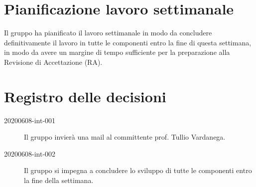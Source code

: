 \documentclass{article}
\begin{document}
\section{Pianificazione lavoro settimanale}%
\label{sec:pianificazione_lavoro_settimanale}
Il gruppo ha pianificato il lavoro settimanale in modo da concludere definitivamente il lavoro in tutte le componenti entro la fine di questa settimana, in modo da avere un margine di tempo sufficiente per la preparazione alla Revisione di Accettazione (RA).

\newpage
\section{Registro delle decisioni}%
\label{sec:registro_delle_decisioni}

\begin{description}
  \item[20200608-int-001] Il gruppo invierà una mail al committente prof. Tullio Vardanega.
  \item[20200608-int-002] Il gruppo si impegna a concludere lo sviluppo di tutte le componenti entro la fine della settimana.
\end{description}

\end{document}
